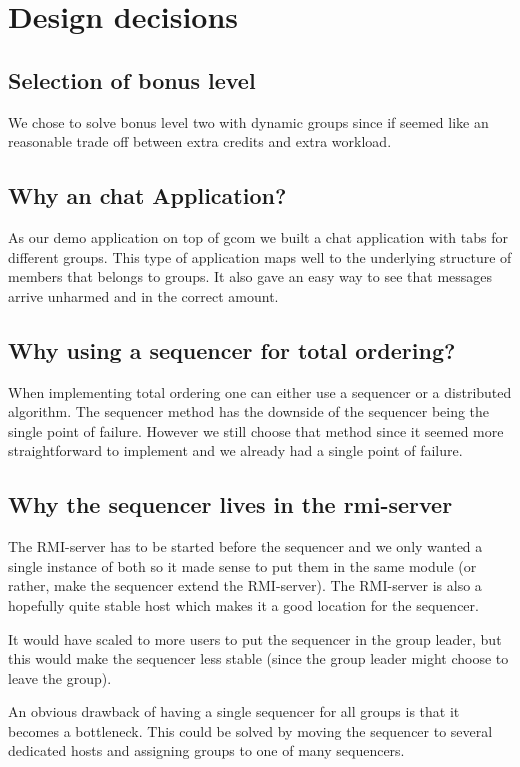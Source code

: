 \documentclass[english]{article}
\begin{document}
\section{Design decisions}

\subsection{Selection of bonus level}
We chose to solve bonus level two with dynamic groups since if seemed like an reasonable trade off between extra credits and extra workload. 

\subsection{Why an chat Application?}
As our demo application on top of gcom we built a chat application with tabs for different groups. This type of application maps well to the underlying structure of members that belongs to groups. It also gave an easy way to see that messages arrive unharmed and in the correct amount. 

\subsection{Why using a sequencer for total ordering?}
When implementing total ordering one can either use a sequencer or a distributed algorithm. The sequencer method has the downside of the sequencer being the single point of failure. However we still choose that method since it seemed more straightforward to implement and we already had a single point of failure.

\subsection{Why the sequencer lives in the rmi-server}
The RMI-server has to be started before the sequencer and we only wanted a single instance of both so it made sense to put them in the same module (or rather, make the sequencer extend the RMI-server). The RMI-server is also a hopefully quite stable host which makes it a good location for the sequencer.

It would have scaled to more users to put the sequencer in the group leader, but this would make the sequencer less stable (since the group leader might choose to leave the group).

An obvious drawback of having a single sequencer for all groups is that it becomes a bottleneck. This could be solved by moving the sequencer to several dedicated hosts and assigning groups to one of many sequencers.
\end{document}
